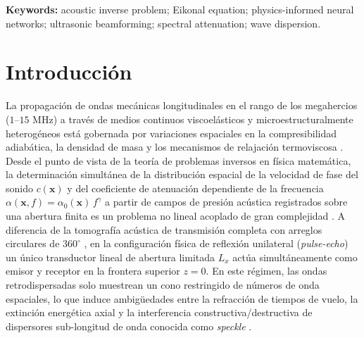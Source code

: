 \documentclass[9pt]{article}
\begin{document}
\noindent\textbf{Keywords:} acoustic inverse problem; Eikonal equation; physics-informed neural networks; ultrasonic beamforming; spectral attenuation; wave dispersion.

\vspace{0.4cm}

\section{Introducción}
\label{sec:introduccion}

La propagación de ondas mecánicas longitudinales en el rango de los megahercios ($1\text{--}15\text{ MHz}$) a través de medios continuos viscoelásticos y microestructuralmente heterogéneos está gobernada por variaciones espaciales en la compresibilidad adiabática, la densidad de masa y los mecanismos de relajación termoviscosa \parencite{Duck1990, Szabo2014}. Desde el punto de vista de la teoría de problemas inversos en física matemática, la determinación simultánea de la distribución espacial de la velocidad de fase del sonido $c(\mathbf{x})$ y del coeficiente de atenuación dependiente de la frecuencia $\alpha(\mathbf{x}, f) = \alpha_0(\mathbf{x})\,f^\gamma$ a partir de campos de presión acústica registrados sobre una abertura finita es un problema no lineal acoplado de gran complejidad \parencite{Pratt1999, Virieux2009}. A diferencia de la tomografía acústica de transmisión completa con arreglos circulares de $360^\circ$ \parencite{Treeby2010}, en la configuración física de reflexión unilateral (\textit{pulse-echo}) un único transductor lineal de abertura limitada $L_x$ actúa simultáneamente como emisor y receptor en la frontera superior $z=0$. En este régimen, las ondas retrodispersadas solo muestrean un cono restringido de números de onda espaciales, lo que induce ambigüedades entre la refracción de tiempos de vuelo, la extinción energética axial y la interferencia constructiva/destructiva de dispersores sub-longitud de onda conocida como \textit{speckle} \parencite{Mallart1994, Jaeger2015}.
\end{document}
